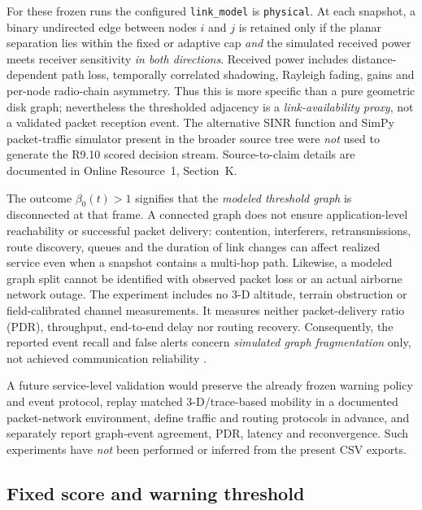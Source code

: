 \documentclass[10pt,a4paper]{article}
\begin{document}
For these frozen runs the configured \texttt{link\_model} is \texttt{physical}. At each snapshot, a binary undirected edge between nodes $i$ and $j$ is retained only if the planar separation lies within the fixed or adaptive cap \emph{and} the simulated received power meets receiver sensitivity \emph{in both directions}. Received power includes distance-dependent path loss, temporally correlated shadowing, Rayleigh fading, gains and per-node radio-chain asymmetry. Thus this is more specific than a pure geometric disk graph; nevertheless the thresholded adjacency is a \emph{link-availability proxy}, not a validated packet reception event. The alternative SINR function and SimPy packet-traffic simulator present in the broader source tree were \emph{not} used to generate the R9.10 scored decision stream. Source-to-claim details are documented in Online Resource~1, Section~K.

The outcome $\beta_0(t)>1$ signifies that the \emph{modeled threshold graph} is disconnected at that frame. A connected graph does not ensure application-level reachability or successful packet delivery: contention, interferers, retransmissions, route discovery, queues and the duration of link changes can affect realized service even when a snapshot contains a multi-hop path. Likewise, a modeled graph split cannot be identified with observed packet loss or an actual airborne network outage. The experiment includes no 3-D altitude, terrain obstruction or field-calibrated channel measurements. It measures neither packet-delivery ratio (PDR), throughput, end-to-end delay nor routing recovery. Consequently, the reported event recall and false alerts concern \emph{simulated graph fragmentation} only, not achieved communication reliability \cite{cocoma2024,karegar2025uav}.

A future service-level validation would preserve the already frozen warning policy and event protocol, replay matched 3-D/trace-based mobility in a documented packet-network environment, define traffic and routing protocols in advance, and separately report graph-event agreement, PDR, latency and reconvergence. Such experiments have \emph{not} been performed or inferred from the present CSV exports.

\subsection{Fixed score and warning threshold}
\end{document}
